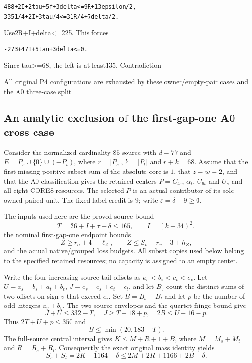 \documentclass[10pt,a4paper]{article}
\theoremstyle{definition}
\begin{document}
\begin{lstlisting}
488+2I+2tau+5f+3delta<=9R+13epsilon/2,
3351/4+2I+3tau/4<=31R/4+7delta/2.
\end{lstlisting}

Use2R+\allowbreak{}I+\allowbreak{}delta\textless=\allowbreak{}225. This forces

\begin{lstlisting}
-273+47I+6tau+3delta<=0.
\end{lstlisting}

Since tau\textgreater=\allowbreak{}68,\allowbreak{} the left is at least135. Contradiction.

All original P4 configurations are exhausted by these owner/empty-pair
cases and the A0 three-case split.

\clearpage
\subsection{An analytic exclusion of the first-gap-one A0 cross case}

Consider the normalized cardinality-$85$ source with $d=77$ and
$E=P_s\cup\{0\}\cup(-P_t)$, where $r=|P_s|$, $k=|P_t|$ and
$r+k=68$. Assume that the first missing positive subset sum of the
absolute core is $1$, that $z=w=2$, and that the A0 classification gives
the retained centers $P=C_{4s}$, $\alpha_t$, $C_{6t}$ and $U_s$ and all
eight CORE8 resources. The selected $P$ is an actual contributor of its
sole-owned paired unit. The fixed-label credit is $9$; write
$\varepsilon=\delta-9\ge0$.

The inputs used here are the proved source bound
\[
 T=26+I+\tau+\delta\le165,\qquad I=(k-34)^2,
\]
the nominal first-gap-one endpoint bounds
\[
 Z\ge r_o+4-\ell_Z,\qquad Z\le S_v-r_v-3+h_Z,
\]
and the actual native/grouped loss budgets. All subset copies used below
belong to the specified retained resources; no capacity is assigned to
an empty center.

Write the four increasing source-tail offsets as $a_v<b_v<c_v<e_v$.
Let $U=a_s+b_s+a_t+b_t$, $J=e_s-c_s+e_t-c_t$, and let $B_v$ count
the distinct sums of two offsets on sign $v$ that exceed $e_v$.
Set $B=B_s+B_t$ and let $p$ be the number of odd integers
$a_v+b_v$. The two source envelopes and the quartet fringe bound give
\[
 J+U\le332-T,\quad J\ge T-18+p,\quad
 2B\le U+16-p.
\]
Thus $2T+U+p\le350$ and
\begin{equation}\label{eq:85-cross-fringe}
 B\le\min(20,183-T).
\end{equation}
The full-source central interval gives
$K\le M+R+1+B$, where $M=M_s+M_t$ and $R=R_s+R_t$.
Consequently the exact original mass identity yields
\begin{equation}\label{eq:85-cross-source}
 S_s+S_t=2K+1164-\delta
 \le2M+2R+1166+2B-\delta.
\end{equation}
\end{document}
